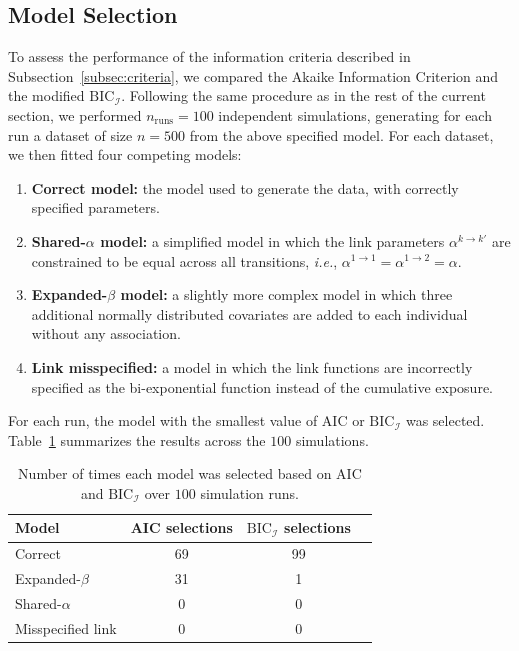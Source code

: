 \documentclass{sn-jnl}
\begin{document}
\subsection{Model Selection} \label{subsec:sim-selection}

To assess the performance of the information criteria described in Subsection~\ref{subsec:criteria}, we compared the Akaike Information Criterion and the modified $\mathrm{BIC}_\mathcal{I}$. Following the same procedure as in the rest of the current section, we performed $n_\mathrm{runs} = 100$ independent simulations, generating for each run a dataset of size $n = 500$ from the above specified model. For each dataset, we then fitted four competing models:

\begin{enumerate}
    \item \textbf{Correct model:} the model used to generate the data, with correctly specified parameters.
    \item \textbf{Shared-$\alpha$ model:} a simplified model in which the link parameters $\alpha^{k \to k'}$ are constrained to be equal across all transitions, \textit{i.e.}, $\alpha^{1 \to 1} = \alpha^{1 \to 2} = \alpha$.
    \item \textbf{Expanded-$\beta$ model:} a slightly more complex model in which three additional normally distributed covariates are added to each individual without any association.  
    \item \textbf{Link misspecified:} a model in which the link functions are incorrectly specified as the bi-exponential function instead of the cumulative exposure.  
\end{enumerate}

For each run, the model with the smallest value of AIC or $\mathrm{BIC}_\mathcal{I}$ was selected. Table~\ref{tbl:model-selection} summarizes the results across the $100$ simulations.  

\begin{table}[H]
    \centering
    \begin{tabular}{lccc}
        \hline
        \textbf{Model} &\textbf{AIC selections} &\textbf{$\mathrm{BIC}_\mathcal{I}$ selections} \\
        \hline
        Correct &69 &99 \\
        Expanded-$\beta$ &31 &1 \\
        Shared-$\alpha$ &0 &0 \\
        Misspecified link &0 &0 \\
        \hline
    \end{tabular}
    \bigbreak
    \caption{Number of times each model was selected based on AIC and $\mathrm{BIC}_\mathcal{I}$ over $100$ simulation runs.}
    \label{tbl:model-selection}
\end{table}
\end{document}
